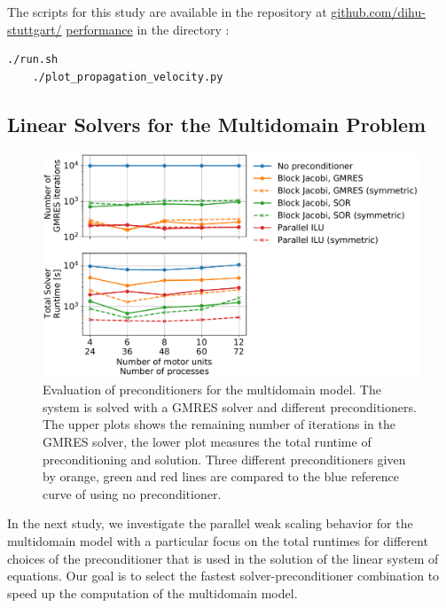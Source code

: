 \begin{reproduce_no_break}
  The scripts for this study are available in the repository at \href{https://github.com/dihu-stuttgart/performance}{github.com/dihu-stuttgart/} \href{https://github.com/dihu-stuttgart/performance}{performance} in the directory :
  \begin{lstlisting}[columns=fullflexible,breaklines=true,postbreak=\mbox{\textcolor{gray}{$\hookrightarrow$}\space}]
    ./run.sh
    ./plot_propagation_velocity.py
  \end{lstlisting}
\end{reproduce_no_break}

\subsection{Linear Solvers for the Multidomain Problem}\label{sec:multidomain_solvers}

\begin{figure}[H]
  \centering%
  \includegraphics[width=\textwidth]{images/results/studies/multidomain_solvers_selected.pdf}%
  \caption{Evaluation of preconditioners for the multidomain model. The system is solved with a GMRES solver and different preconditioners. The upper plots shows the remaining number of iterations in the GMRES solver, the lower plot measures the total runtime of preconditioning and solution. Three different preconditioners given by orange, green and red lines are compared to the blue reference curve of using no preconditioner.}%
  \label{fig:multidomain_solver}%
\end{figure}

In the next study, we investigate the parallel weak scaling behavior for the multidomain model
with a particular focus on the total runtimes for different choices of the preconditioner that is used in the solution of the linear system of equations. Our goal is to select the fastest solver-preconditioner combination to speed up the computation of the multidomain model.

